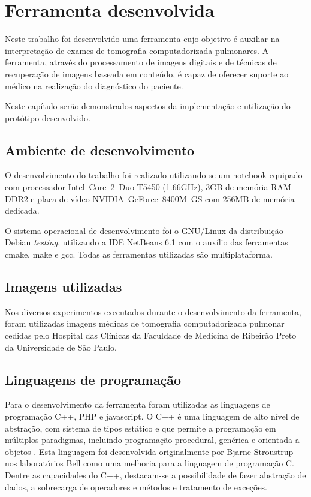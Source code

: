 \chapter{Ferramenta desenvolvida}

Neste trabalho foi desenvolvido uma ferramenta cujo objetivo é auxiliar na interpretação de exames de tomografia computadorizada pulmonares. A ferramenta, através do processamento de imagens digitais e de técnicas de recuperação de imagens baseada em conteúdo, é capaz de oferecer suporte ao médico na realização do diagnóstico do paciente.

Neste capítulo serão demonstrados aspectos da implementação e utilização do protótipo desenvolvido.

\section{Ambiente de desenvolvimento}

O desenvolvimento do trabalho foi realizado utilizando-se um notebook equipado com processador Intel\textregistered~Core\texttrademark~2~Duo T5450 (1.66GHz), 3GB de memória RAM DDR2 e placa de vídeo NVIDIA\textregistered~GeForce\texttrademark~8400M~GS com 256MB de memória dedicada.

O sistema operacional de desenvolvimento foi o GNU/Linux da distribuição Debian \textit{testing}, utilizando a IDE NetBeans 6.1 com o auxílio das ferramentas cmake, make e gcc. Todas as ferramentas utilizadas são multiplataforma.

\section{Imagens utilizadas}

Nos diversos experimentos executados durante o desenvolvimento da ferramenta, foram utilizadas imagens médicas de tomografia computadorizada pulmonar cedidas pelo Hospital das Clínicas da Faculdade de Medicina de Ribeirão Preto da Universidade de São Paulo.

\section{Linguagens de programação}

Para o desenvolvimento da ferramenta foram utilizadas as linguagens de programação C++, PHP e javascript. O C++ é uma linguagem de alto nível de abstração, com sistema de tipos estático e que permite a programação em múltiplos paradigmas, incluindo programação procedural, genérica e orientada a objetos \cite{stroustrup2000}. Esta linguagem foi desenvolvida originalmente por Bjarne Stroustrup nos laboratórios Bell como uma melhoria para a linguagem de programação C. Dentre as capacidades do C++, destacam-se a possibilidade de fazer abstração de dados, a sobrecarga de operadores e métodos e tratamento de exceções.

